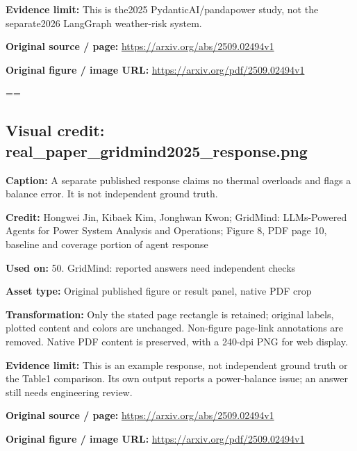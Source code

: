 \documentclass[10pt,letterpaper]{article}
\begin{document}
\textbf{Evidence limit:} This is the2025 PydanticAI/pandapower study, not the separate2026 LangGraph weather-risk system.\par
\textbf{Original source / page:} \href{https://arxiv.org/abs/2509.02494v1}{\small\ttfamily https:/\allowbreak{}/\allowbreak{}arxiv.\allowbreak{}org/\allowbreak{}abs/\allowbreak{}2509.\allowbreak{}02494v1}\par
\textbf{Original figure / image URL:} \href{https://arxiv.org/pdf/2509.02494v1}{\small\ttfamily https:/\allowbreak{}/\allowbreak{}arxiv.\allowbreak{}org/\allowbreak{}pdf/\allowbreak{}2509.\allowbreak{}02494v1}\par
\egroup\par\noindent\box\readingEntry\par\medskip
\setbox\readingEntry=\vbox\bgroup\hsize=\linewidth\subsection*{Visual credit: real\_paper\_gridmind2025\_response.png}
\textbf{Caption:} A separate published response claims no thermal overloads and flags a balance error. It is not independent ground truth.\par
\textbf{Credit:} Hongwei Jin, Kibaek Kim, Jonghwan Kwon; GridMind: LLMs-Powered Agents for Power System Analysis and Operations; Figure 8, PDF page 10, baseline and coverage portion of agent response\par
\textbf{Used on:} 50. GridMind: reported answers need independent checks\par
\textbf{Asset type:} Original published figure or result panel, native PDF crop\par
\textbf{Transformation:} Only the stated page rectangle is retained; original labels, plotted content and colors are unchanged. Non-figure page-link annotations are removed. Native PDF content is preserved, with a 240-dpi PNG for web display.\par
\textbf{Evidence limit:} This is an example response, not independent ground truth or the Table1 comparison. Its own output reports a power-balance issue; an answer still needs engineering review.\par
\textbf{Original source / page:} \href{https://arxiv.org/abs/2509.02494v1}{\small\ttfamily https:/\allowbreak{}/\allowbreak{}arxiv.\allowbreak{}org/\allowbreak{}abs/\allowbreak{}2509.\allowbreak{}02494v1}\par
\textbf{Original figure / image URL:} \href{https://arxiv.org/pdf/2509.02494v1}{\small\ttfamily https:/\allowbreak{}/\allowbreak{}arxiv.\allowbreak{}org/\allowbreak{}pdf/\allowbreak{}2509.\allowbreak{}02494v1}\par
\end{document}
